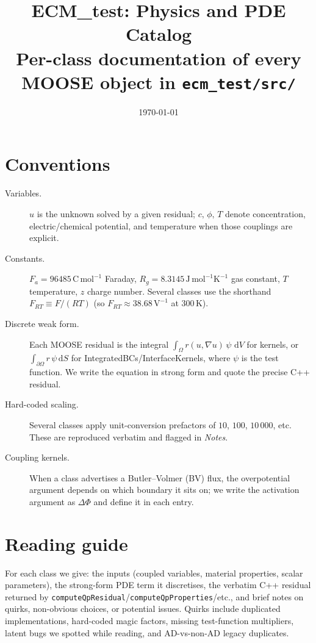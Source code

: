 \documentclass[11pt]{article}
\title{ECM\_test: Physics and PDE Catalog\\
       \large Per-class documentation of every MOOSE object in \texttt{ecm\_test/src/}}
\author{}
\date{\today}
\newcommand{\F}{F_{\!a}}            %
\newcommand{\Rg}{R_{\!g}}           %
\newcommand{\dV}{\,\mathrm{d}V}
\newcommand{\dS}{\,\mathrm{d}S}
\begin{document}
\maketitle
\tableofcontents

\section*{Conventions}
\begin{description}
  \item[Variables.] $u$ is the unknown solved by a given residual; $c,\,\phi,\,T$ denote
    concentration, electric/chemical potential, and temperature when those couplings are explicit.
  \item[Constants.] $\F\!=\!96485\,\mathrm{C\,mol^{-1}}$ Faraday, $\Rg\!=\!8.3145\,\mathrm{J\,mol^{-1}K^{-1}}$ gas constant,
    $T$ temperature, $z$ charge number. Several classes use the shorthand
    $F_{RT}\!\equiv\!F/(RT)$ (so $F_{RT}\!\approx\!38.68\,\mathrm{V^{-1}}$ at 300\,K).
  \item[Discrete weak form.] Each MOOSE residual is the integral
    $\int_\Omega r(u,\nabla u)\,\psi\,\dV$ for kernels, or $\int_{\partial\Omega} r\,\psi\dS$
    for IntegratedBCs/InterfaceKernels, where $\psi$ is the test function. We write the
    equation in strong form and quote the precise C++ residual.
  \item[Hard-coded scaling.] Several classes apply unit-conversion prefactors of $10$, $100$,
    $10\,000$, etc. These are reproduced verbatim and flagged in \emph{Notes}.
  \item[Coupling kernels.] When a class advertises a Butler--Volmer (BV) flux, the
    overpotential argument depends on which boundary it sits on; we write the activation
    argument as $\Delta\Phi$ and define it in each entry.
\end{description}

\section*{Reading guide}
For each class we give: the inputs (coupled variables, material properties, scalar parameters),
the strong-form PDE term it discretises, the verbatim C++ residual returned by
\texttt{computeQpResidual}/\texttt{computeQpProperties}/etc., and brief notes on quirks,
non-obvious choices, or potential issues. Quirks include duplicated implementations,
hard-coded magic factors, missing test-function multipliers, latent bugs we spotted while
reading, and AD-vs-non-AD legacy duplicates.
\end{document}
